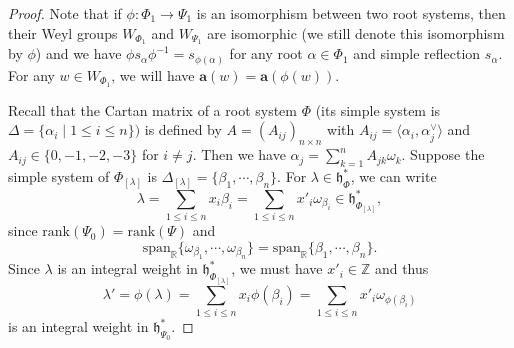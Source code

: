 \documentclass[10pt,a4paper]{amsart}
\newcommand{\aff}{ \mathbf{a} }
\newcommand{\lam}{\lambda}
\newcommand{\lest}{\leqslant}
\begin{document}
\begin{proof}
Note that if $\phi: \Phi_1 \rightarrow \Psi_1$  is an isomorphism between two root systems, then their Weyl groups $W_{\Phi_1}$  and $W_{\Psi_1}$ are isomorphic (we still denote this isomorphism by $\phi$) and we have $\phi s_{\alpha}\phi ^{-1}=s_{\phi(\alpha)}$ for any root $\alpha \in \Phi_1$  and simple reflection $s_{\alpha}$. For any $w\in W_{\Phi_1}$, we will have 
$\aff(w)=\aff(\phi(w))$. 

Recall that the Cartan matrix of a root system $\Phi$ (its simple system is $\Delta=\{\alpha_i \mid  1\lest i\lest n\})$ is defined by
$A=(A_{ij})_{n\times n}$ with $A_{ij}={\langle \alpha_i, \alpha_j^\vee \rangle}$ and $A_{ij}\in \{0,-1,-2,-3\}$ for $i \neq j$. Then we have $\alpha_j=\sum\limits_{k=1}^n A_{jk}\omega_k$. 
Suppose the simple system of $\Phi_{[\lam]}$ is $\Delta_{[\lam]}=\{\beta_1,\cdots,\beta_n\}$. For $\lam \in \mathfrak{h}_{\Phi}^*$, we can write $$\lam=\sum_{1\lest i\lest n}x_i\beta_i=\sum_{1\lest i\lest n}x'_i\omega_{\beta_i}\in \mathfrak{h}_{\Phi_{[\lam]}}^*,$$ since $\mathrm{rank} {(\Psi_0)}=\mathrm{rank} {(\Psi)}$ and $$\mathrm{span}_{\mathbb{R}}\{\omega_{\beta_1},\cdots,\omega_{\beta_n}\}=\mathrm{span}_{\mathbb{R}}\{\beta_1,\cdots,\beta_n\}.$$
Since $\lam$ is an integral weight in $\mathfrak{h}_{\Phi_{[\lam]}}^*$, we must have $x'_i\in \mathbb{Z}$ and thus
$$\lam'=\phi(\lam)=\sum_{1\lest i\lest n}x_i\phi(\beta_i)=\sum_{1\lest i\lest n}x'_i\omega_{\phi({\beta_i})}$$ is an integral weight in $\mathfrak{h}_{\Psi_{0}}^*$.












\end{proof}
\end{document}

